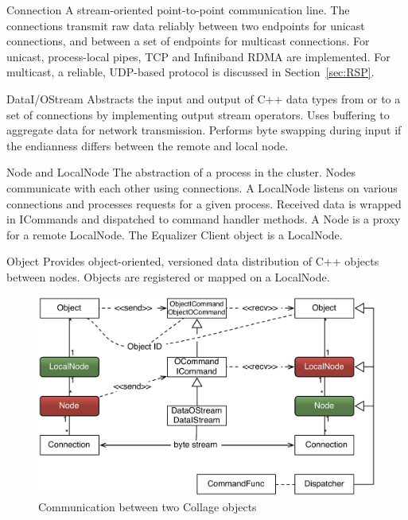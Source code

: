 \documentclass[10pt,journal,compsoc]{IEEEtran}
\newcommand{\sref}[1]{Section~\ref{#1}}
\begin{document}
\begin{compactdesc}
\item[Connection] A stream-oriented point-to-point communication
  line. The connections
  transmit raw data reliably between two endpoints for unicast connections, and
  between a set of endpoints for multicast connections. For unicast,
  process-local pipes, TCP and Infiniband RDMA are implemented. For multicast,
  a reliable, UDP-based protocol is discussed in \sref{sec:RSP}.
\item[DataI/OStream] Abstracts the input and output of C++ data types from or to
  a set of connections by implementing output stream operators. Uses buffering
  to aggregate data for network transmission. Performs byte swapping during
  input if the endianness differs between the remote and local node.
\item[Node and LocalNode] The abstraction of a process in the cluster. Nodes
  communicate with each other using connections. A LocalNode listens on various
  connections and processes requests for a given process. Received data is
  wrapped in ICommands and dispatched to command handler methods. A Node is a
  proxy for a remote LocalNode. The \textsf{Equalizer} Client object is a
LocalNode.
\item[Object] Provides object-oriented, versioned data distribution of C++
  objects between nodes. Objects are registered or mapped on a Local\-Node.
\end{compactdesc}

\begin{figure}[ht]\center
  \includegraphics[width=\columnwidth]{images/netObject}
  \caption{\label{fNetObject}Communication between two \textsf{Collage} objects}
\end{figure}
\end{document}
